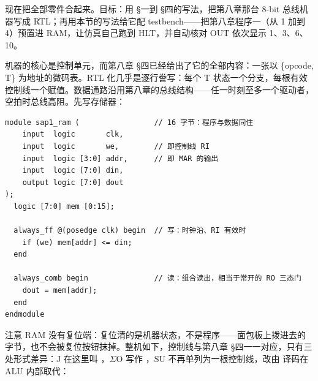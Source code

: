 现在把全部零件合起来。目标：用 §一到 §四的写法，把第八章那台 8-bit 总线机器写成 RTL；再用本节的写法给它配 testbench——把第八章程序一（从 1 加到 4）预置进 RAM，让仿真自己跑到 HLT，并自动核对 OUT 依次显示 1、3、6、10。

机器的核心是控制单元，而第八章 §四已经给出了它的全部内容：一张以 \{opcode, T\} 为地址的微码表。RTL 化几乎是逐行誊写：每个 T 状态一个分支，每根有效控制线一个赋值。数据通路沿用第八章的总线结构——任一时刻至多一个驱动者，空拍时总线高阻。先写存储器：

\begin{lstlisting}
module sap1_ram (                 // 16 字节：程序与数据同住
    input  logic       clk,
    input  logic       we,        // 即控制线 RI
    input  logic [3:0] addr,      // 即 MAR 的输出
    input  logic [7:0] din,
    output logic [7:0] dout
);
  logic [7:0] mem [0:15];

  always_ff @(posedge clk) begin  // 写：时钟沿、RI 有效时
    if (we) mem[addr] <= din;
  end

  always_comb begin               // 读：组合读出，相当于常开的 RO 三态门
    dout = mem[addr];
  end
endmodule
\end{lstlisting}

注意 RAM 没有复位端：复位清的是机器状态，不是程序——面包板上拨进去的字节，也不会被复位按钮抹掉。整机如下，控制线与第八章 §四一一对应，只有三处形式差异：J 在这里叫 ，$\Sigma$O 写作 ，SU 不再单列为一根控制线，改由  译码在 ALU 内部取代：

